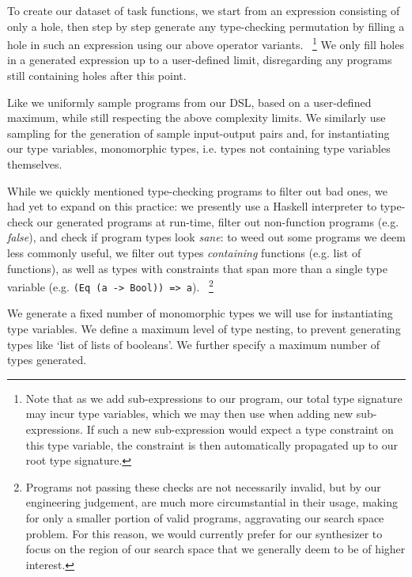 \documentclass{article}
\begin{document}

To create our dataset of task functions,
we start from an expression consisting of only a hole,
then step by step generate any type-checking permutation
by filling a hole in such an expression using our above operator variants.%
~\footnote{
    Note that as we add sub-expressions to our program,
    our total type signature may incur type variables,
    which we may then use when adding new sub-expressions.
    If such a new sub-expression would expect a type constraint on this type variable,
    the constraint is then automatically propagated up to our root type signature.
}
We only fill holes in a generated expression up to a 
user-defined limit,
disregarding any programs still containing holes after this point.

Like \citet{nsps} we uniformly sample programs from our DSL,
based on a 
user-defined maximum,
while still respecting the above complexity limits.
We similarly use sampling for the generation of sample input-output pairs and,
for instantiating our type variables, monomorphic types,
i.e. types not containing type variables themselves.

While we quickly mentioned type-checking programs to filter out bad ones,
we had yet to expand on this practice:
we presently use a Haskell interpreter to type-check our generated programs at run-time,
filter out non-function programs (e.g. \emph{false}),
and check if program types look \emph{sane}:
to weed out some programs we deem less commonly useful,
we filter out types \emph{containing} functions (e.g. list of functions),
as well as types with constraints that span more than a single type variable (e.g. \verb|(Eq (a -> Bool)) => a|).%
~\footnote{
    Programs not passing these checks are not necessarily invalid,
    but by our engineering judgement,
    are much more circumstantial in their usage,
    making for only a smaller portion of valid programs,
    aggravating our search space problem.
    For this reason, we would currently prefer for our synthesizer to focus on
    the region of our search space that we generally deem to be of higher interest.
}

We generate a fixed number of monomorphic types we will use for instantiating type variables.
We define a
maximum level of type nesting,
to prevent generating types like `list of lists of booleans'.
We further specify a maximum number of types generated.
\end{document}
